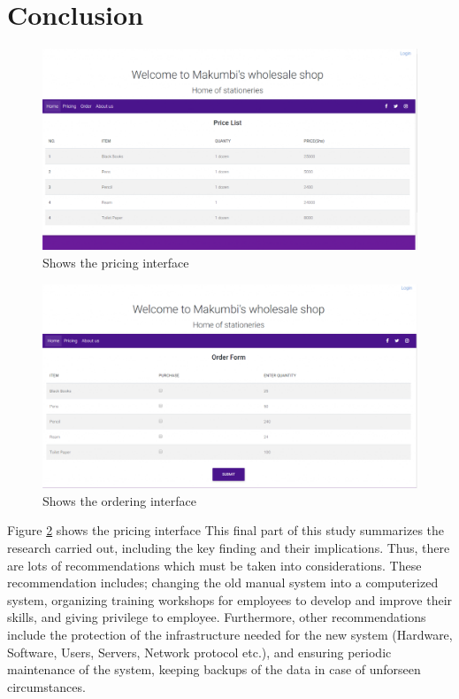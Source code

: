 \documentclass[12pt]{article}
\begin{document}
\section{Conclusion}
\begin{figure}
\includegraphics[width=\linewidth]{interface1.png}
\caption{ Shows the pricing interface}
\label{fig:Pricing}
\end{figure}
\begin{figure}
\includegraphics[width=\linewidth]{interface2.png}
\caption{ Shows the ordering interface}
\label{fig:Pricing}
\end{figure}
Figure \ref{fig:Pricing} shows the pricing interface
This final part of this study summarizes the research carried out, including the key finding and their implications. Thus, there are lots of recommendations which must be taken into considerations. These recommendation includes; changing the old manual system into a computerized system, organizing training workshops for employees to develop and improve their skills, and giving privilege to employee. Furthermore, other recommendations include the protection of the infrastructure needed for the new system (Hardware, Software, Users, Servers, Network protocol etc.), and ensuring periodic maintenance of the system, keeping backups of the data in case of unforseen circumstances.


\end{document}

